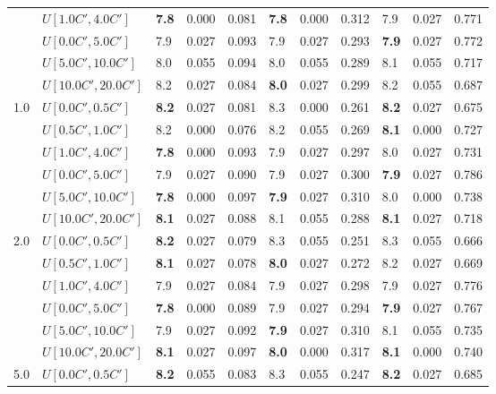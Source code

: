 \begin{table}[h]
{\begin{tabular}{|l|l||l|l|l||l|l|l||l|l|l|}
       & $U[1.0C',4.0C']$ & \textbf{7.8} & 0.000 & 0.081 & \textbf{7.8} & 0.000 & 0.312 & 7.9 & 0.027 & 0.771 \\
       & $U[0.0C',5.0C']$ & 7.9 & 0.027 & 0.093 & 7.9 & 0.027 & 0.293 & \textbf{7.9} & 0.027 & 0.772 \\
       & $U[5.0C',10.0C']$ & 8.0 & 0.055 & 0.094 & 8.0 & 0.055 & 0.289 & 8.1 & 0.055 & 0.717 \\
       & $U[10.0C',20.0C']$ & 8.2 & 0.027 & 0.084 & \textbf{8.0} & 0.027 & 0.299 & 8.2 & 0.055 & 0.687 \\
      \hline\hline
      \multirow{6}{*}{1.0} & $U[0.0C',0.5C']$ & \textbf{8.2} & 0.027 & 0.081 & 8.3 & 0.000 & 0.261 & \textbf{8.2} & 0.027 & 0.675 \\
       & $U[0.5C',1.0C']$ & 8.2 & 0.000 & 0.076 & 8.2 & 0.055 & 0.269 & \textbf{8.1} & 0.000 & 0.727 \\
       & $U[1.0C',4.0C']$ & \textbf{7.8} & 0.000 & 0.093 & 7.9 & 0.027 & 0.297 & 8.0 & 0.027 & 0.731 \\
       & $U[0.0C',5.0C']$ & 7.9 & 0.027 & 0.090 & 7.9 & 0.027 & 0.300 & \textbf{7.9} & 0.027 & 0.786 \\
       & $U[5.0C',10.0C']$ & \textbf{7.8} & 0.000 & 0.097 & \textbf{7.9} & 0.027 & 0.310 & 8.0 & 0.000 & 0.738 \\
       & $U[10.0C',20.0C']$ & \textbf{8.1} & 0.027 & 0.088 & 8.1 & 0.055 & 0.288 & \textbf{8.1} & 0.027 & 0.718 \\
      \hline\hline
      \multirow{6}{*}{2.0} & $U[0.0C',0.5C']$ & \textbf{8.2} & 0.027 & 0.079 & 8.3 & 0.055 & 0.251 & 8.3 & 0.055 & 0.666 \\
       & $U[0.5C',1.0C']$ & \textbf{8.1} & 0.027 & 0.078 & \textbf{8.0} & 0.027 & 0.272 & 8.2 & 0.027 & 0.669 \\
       & $U[1.0C',4.0C']$ & 7.9 & 0.027 & 0.084 & 7.9 & 0.027 & 0.298 & 7.9 & 0.027 & 0.776 \\
       & $U[0.0C',5.0C']$ & \textbf{7.8} & 0.000 & 0.089 & 7.9 & 0.027 & 0.294 & \textbf{7.9} & 0.027 & 0.767 \\
       & $U[5.0C',10.0C']$ & 7.9 & 0.027 & 0.092 & \textbf{7.9} & 0.027 & 0.310 & 8.1 & 0.055 & 0.735 \\
       & $U[10.0C',20.0C']$ & \textbf{8.1} & 0.027 & 0.097 & \textbf{8.0} & 0.000 & 0.317 & \textbf{8.1} & 0.000 & 0.740 \\
      \hline\hline
      \multirow{6}{*}{5.0} & $U[0.0C',0.5C']$ & \textbf{8.2} & 0.055 & 0.083 & 8.3 & 0.055 & 0.247 & \textbf{8.2} & 0.027 & 0.685 \\

\end{tabular}}
\end{table}
